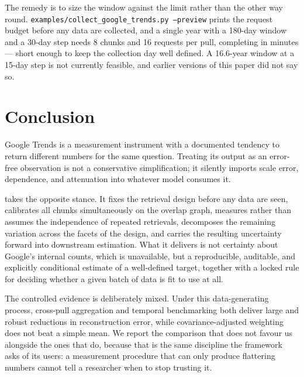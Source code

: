 \documentclass[12pt,a4paper,oneside]{article}
\begin{document}
\begin{itemize}
The remedy is to size the window against the limit rather than the other way
round. \texttt{examples/collect\_google\_trends.py --preview} prints the request
budget before any data are collected, and a single year with a 180-day window and
a 30-day step needs 8 chunks and 16 requests per pull, completing in minutes ---
short enough to keep the collection day well defined. A 16.6-year window at a
15-day step is not currently feasible, and earlier versions of this paper did not
say so.
\end{itemize}

\section{Conclusion}

Google Trends is a measurement instrument with a documented tendency to return
different numbers for the same question. Treating its output as an
error-free observation is not a conservative simplification; it silently imports
scale error, dependence, and attenuation into whatever model consumes it.

\RACER{} takes the opposite stance. It fixes the retrieval design before any
data are seen, calibrates all chunks simultaneously on the overlap graph,
measures rather than assumes the independence of repeated retrievals,
decomposes the remaining variation across the facets of the design, and carries
the resulting uncertainty forward into downstream estimation. What it delivers
is not certainty about Google's internal counts, which is unavailable, but a
reproducible, auditable, and explicitly conditional estimate of a well-defined
target, together with a locked rule for deciding whether a given batch of data
is fit to use at all.

The controlled evidence is deliberately mixed. Under this data-generating
process, cross-pull aggregation and temporal benchmarking both deliver large and
robust reductions in reconstruction error, while covariance-adjusted weighting
does not beat a simple mean. We report the comparison that does not favour us
alongside the ones that do, because that is the same discipline the framework
asks of its users: a measurement procedure that can only produce flattering
numbers cannot tell a researcher when to stop trusting it.
\end{document}
